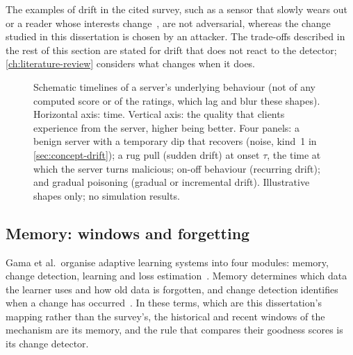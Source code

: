 The examples of drift in the cited survey, such as a sensor that slowly wears out or a reader whose interests change~\cite[pp.~44:2, 44:5--44:6]{Gama2014}, are not adversarial, whereas the change studied in this dissertation is chosen by an attacker. The trade-offs described in the rest of this section are stated for drift that does not react to the detector; \cref{ch:literature-review} considers what changes when it does.

\begin{figure}[tb]
  \centering
  \caption[Schematic behaviour patterns of a server]{Schematic timelines of a server's underlying behaviour (not of any computed score or of the ratings, which lag and blur these shapes). Horizontal axis: time. Vertical axis: the quality that clients experience from the server, higher being better. Four panels: a benign server with a temporary dip that recovers (noise, kind~1 in \cref{sec:concept-drift}); a rug pull (sudden drift) at onset $\tau$, the time at which the server turns malicious; on-off behaviour (recurring drift); and gradual poisoning (gradual or incremental drift). Illustrative shapes only; no simulation results.}\label{fig:behaviour-patterns}
\end{figure}

\subsection{Memory: windows and forgetting}\label{sec:memory-windows}

Gama et al.\ organise adaptive learning systems into four modules: memory, change detection, learning and loss estimation~\cite[pp.~44:7, 44:11]{Gama2014}. Memory determines which data the learner uses and how old data is forgotten, and change detection identifies when a change has occurred~\cite[pp.~44:11, 44:14]{Gama2014}. In these terms, which are this dissertation's mapping rather than the survey's, the historical and recent windows of the mechanism are its memory, and the rule that compares their goodness scores is its change detector.

